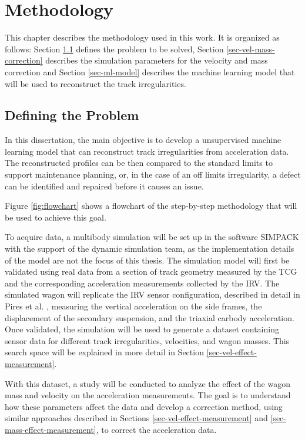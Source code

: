 \chapter{Methodology} \label{sec-methodology}

This chapter describes the methodology used in this work. It is organized as follows: Section \ref{sec-defining-problem} defines the problem to be solved, Section \ref{sec-vel-mass-correction} describes the simulation parameters for the velocity and mass correction and Section \ref{sec-ml-model} describes the machine learning model that will be used to reconstruct the track irregularities.

\section{Defining the Problem} \label{sec-defining-problem}

In this dissertation, the main objective is to develop a unsupervised machine learning model that can reconstruct track irregularities from acceleration data. The reconstructed profiles can be then compared to the standard limits to support maintenance planning, or, in the case of an off limits irregularity, a defect can be identified and repaired before it causes an issue. 

Figure \ref{fig:flowchart} shows a flowchart of the step-by-step methodology that will be used to achieve this goal. 

To acquire data, a multibody simulation will be set up in the software SIMPACK with the support of the dynamic simulation team, as the implementation details of the model are not the focus of this thesis. The simulation model will first be validated using real data from a section of track geometry measured by the TCG and the corresponding acceleration measurements collected by the IRV. The simulated wagon will replicate the IRV sensor configuration, described in detail in Pires et al. \cite{PIRES2024107191}, measuring the vertical acceleration on the side frames, the displacement of the secondary suspension, and the triaxial carbody acceleration. Once validated, the simulation will be used to generate a dataset containing sensor data for different track irregularities, velocities, and wagon masses. This search space will be explained in more detail in Section \ref{sec-vel-effect-measurement}.

With this dataset, a study will be conducted to analyze the effect of the wagon mass and velocity on the acceleration measurements. The goal is to understand how these parameters affect the data and develop a correction method, using similar approaches described in Sections \ref{sec-vel-effect-measurement} and \ref{sec-mass-effect-measurement}, to correct the acceleration data.

